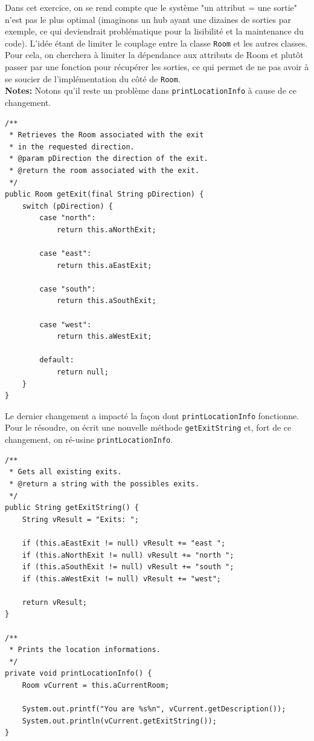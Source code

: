 \documentclass[a4paper,12pt]{report}
\begin{document}
\begin{exercise}[subtitle=getExit]

Dans cet exercice, on se rend compte que le système "un attribut = une sortie" n'est pas le plus optimal (imaginons un hub ayant une dizaines de sorties par exemple, ce qui deviendrait problématique pour la lisibilité et la maintenance du code). L'idée étant de limiter le couplage entre la classe \verb|Room| et les autres classes. Pour cela, on cherchera à limiter la dépendance aux attributs de Room et plutôt passer par une fonction pour récupérer les sorties, ce qui permet de ne pas avoir à se soucier de l'implémentation du côté de \verb|Room|.\\ 

\textbf{Notes:} Notons qu'il reste un problème dans \verb|printLocationInfo| à cause de ce changement.

\begin{verbatim}
/**
 * Retrieves the Room associated with the exit
 * in the requested direction.
 * @param pDirection the direction of the exit.
 * @return the room associated with the exit.
 */
public Room getExit(final String pDirection) {
    switch (pDirection) {
        case "north":
            return this.aNorthExit;

        case "east":
            return this.aEastExit;

        case "south":
            return this.aSouthExit;

        case "west":
            return this.aWestExit;

        default:
            return null;
    }
}
\end{verbatim}
\end{exercise}

\begin{exercise}[subtitle=getExitString]
Le dernier changement a impacté la façon dont \verb|printLocationInfo| fonctionne. Pour le résoudre, on écrit une nouvelle méthode \verb|getExitString| et, fort de ce changement, on ré-usine \verb|printLocationInfo|.

\begin{verbatim}
/**
 * Gets all existing exits.
 * @return a string with the possibles exits.
 */
public String getExitString() {
    String vResult = "Exits: ";

    if (this.aEastExit != null) vResult += "east ";
    if (this.aNorthExit != null) vResult += "north ";
    if (this.aSouthExit != null) vResult += "south ";
    if (this.aWestExit != null) vResult += "west";

    return vResult;
}

/**
 * Prints the location informations.
 */
private void printLocationInfo() {
    Room vCurrent = this.aCurrentRoom;

    System.out.printf("You are %s%n", vCurrent.getDescription());
    System.out.println(vCurrent.getExitString());
}
\end{verbatim}
\end{exercise}
\end{document}
